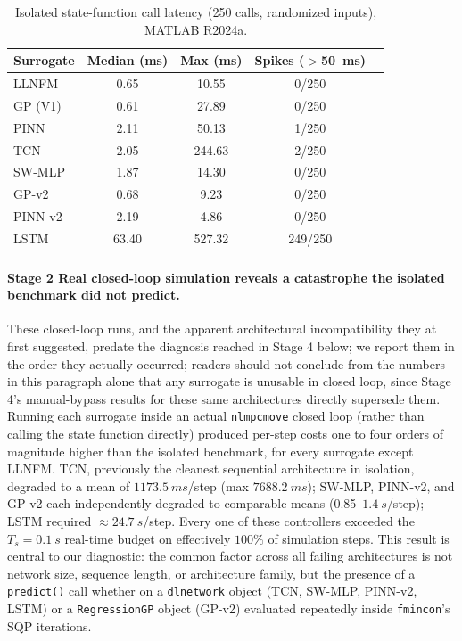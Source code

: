 \begin{table}[H]
\centering
\caption{Isolated state-function call latency (250 calls, randomized
inputs), MATLAB R2024a.}
\label{tab:isolated_benchmark}
\begin{tabular}{lcccc}
\toprule
Surrogate & Median (ms) & Max (ms) & Spikes ($>$\SI{50}{ms}) \\
\midrule
LLNFM   & 0.65  & 10.55  & 0/250 \\
GP (V1) & 0.61  & 27.89  & 0/250 \\
PINN    & 2.11  & 50.13  & 1/250 \\
TCN     & 2.05  & 244.63 & 2/250 \\
SW-MLP  & 1.87  & 14.30  & 0/250 \\
GP-v2   & 0.68  & 9.23   & 0/250 \\
PINN-v2 & 2.19  & 4.86   & 0/250 \\
LSTM    & 63.40 & 527.32 & 249/250 \\
\bottomrule
\end{tabular}
\end{table}

\paragraph{Stage 2  Real closed-loop simulation reveals a
catastrophe the isolated benchmark did not predict.} These closed-loop
runs, and the apparent architectural incompatibility they at first
suggested, predate the diagnosis reached in Stage 4 below; we report
them in the order they actually occurred; readers should not conclude
from the numbers in this paragraph alone that any surrogate is
unusable in closed loop, since Stage 4's manual-bypass results for
these same architectures directly supersede them. Running each
surrogate inside an actual \texttt{nlmpcmove} closed loop (rather than
calling the state function directly) produced per-step costs one to
four orders of magnitude higher than the isolated benchmark, for every
surrogate except LLNFM. TCN, previously the cleanest sequential
architecture in isolation, degraded to a mean of $\SI{1173.5}{ms}$/step
(max $\SI{7688.2}{ms}$); SW-MLP, PINN-v2, and GP-v2 each independently
degraded to comparable means (0.85--$\SI{1.4}{s}$/step); LSTM required
$\approx\SI{24.7}{s}$/step. Every one of these controllers exceeded the
$T_s=\SI{0.1}{s}$ real-time budget on effectively $100\%$ of simulation
steps. This result is central to our diagnostic: the common factor
across all failing architectures is not network size, sequence length,
or architecture family, but the presence of a \texttt{predict()} call
 whether on a \texttt{dlnetwork} object (TCN, SW-MLP, PINN-v2, LSTM)
or a \texttt{RegressionGP} object (GP-v2)  evaluated repeatedly
inside \texttt{fmincon}'s SQP iterations.

